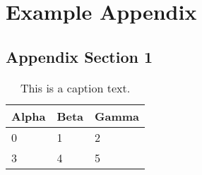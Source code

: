 %
\chapter{Example Appendix}
\label{sec:appendix}


\section{Appendix Section 1}
\label{sec:appendix:sec1}

\begin{table}[h]
	\begin{tabularx}{\textwidth}{X | X | X}
		Alpha		& Beta			& Gamma			\\ \hline
		0			& 1				& 2				\\ \hline
		3			& 4				& 5				\\ %
	\end{tabularx}
	\label{tab:table1}
	\caption{This is a caption text.}
\end{table}

